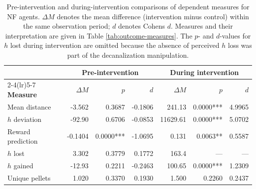 \documentclass[12pt,fleqn]{article}
\begin{document}
\begin{appendices}
\begin{table}[H]
  \centering
  \small
  \setlength{\tabcolsep}{2pt}
  \begin{tabular}{@{}lrrrrrr@{}}
    \toprule
     & \multicolumn{3}{c}{\textbf{Pre-intervention}} & \multicolumn{3}{c}{\textbf{During intervention}} \\
    \cmidrule(lr){2-4}\cmidrule(lr){5-7}
\textbf{Measure} & \textbf{\(\Delta M\)} & \textbf{\(p\)} & \textbf{\(d\)} & \textbf{\(\Delta M\)} & \textbf{\(p\)} & \textbf{\(d\)} \\
    \midrule
    Mean distance & -3.562 & 0.3687 & -0.1806 & 241.13 & 0.0000*** & 4.9965 \\
    \(h\) deviation & -92.90 & 0.6706 & -0.0853 & 11629.61 & 0.0000*** & 5.0702 \\
    Reward prediction & -0.1404 & 0.0000*** & -1.0695 & 0.131 & 0.0063** & 0.5587 \\
    \(h\) lost & 3.302 & 0.3779 & 0.1772 & 163.4 & --- & --- \\
    \(h\) gained & -12.93 & 0.2211 & -0.2463 & 100.65 & 0.0000*** & 1.2309 \\
    Unique pellets & 1.020 & 0.3370 & 0.1930 & 1.500 & 0.2260 & 0.2437 \\
    \bottomrule
  \end{tabular}
  \caption{Pre-intervention and during-intervention comparisons of dependent measures for NF agents. \(\Delta M\) denotes the mean difference (intervention minus control) within the same observation period; \(d\) denotes Cohen\textquotesingle s \(d\). Measures and their interpretation are given in Table \ref{tab:outcome-measures}. The \(p\)- and \(d\)-values for \(h\) lost during intervention are omitted because the absence of perceived \(h\) loss was part of the decanalization manipulation.}
  \label{model-analysis-nf-early}
\end{table}


\end{appendices}
\end{document}
